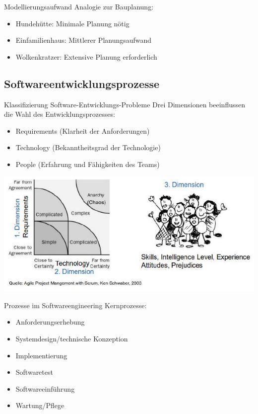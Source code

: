 \begin{example}{Modellierungsaufwand}
Analogie zur Bauplanung:
\begin{itemize}
    \item Hundehütte: Minimale Planung nötig
    \item Einfamilienhaus: Mittlerer Planungsaufwand
    \item Wolkenkratzer: Extensive Planung erforderlich
\end{itemize}
\end{example}

\subsection{Softwareentwicklungsprozesse}

\begin{concept}{Klassifizierung Software-Entwicklungs-Probleme}
Drei Dimensionen beeinflussen die Wahl des Entwicklungsprozesses:
\begin{itemize}
    \item Requirements (Klarheit der Anforderungen)
    \item Technology (Bekanntheitsgrad der Technologie)
    \item People (Erfahrung und Fähigkeiten des Teams)
\end{itemize}
\includegraphics[width=\linewidth]{images/2024_12_29_0d1d7b5551ea1b4b41bdg-01}
\end{concept}

\begin{theorem}{Prozesse im Softwareengineering}
Kernprozesse:
\begin{itemize}
    \item Anforderungserhebung
    \item Systemdesign/technische Konzeption
    \item Implementierung
    \item Softwaretest
    \item Softwareeinführung
    \item Wartung/Pflege
\end{itemize}
\end{theorem}

